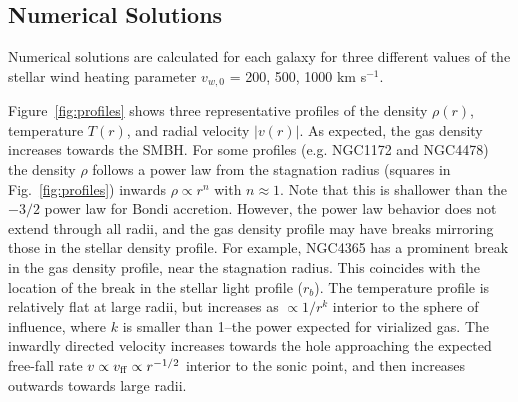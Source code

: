 \documentclass[usenatbib,fleqn]{mn2e}
\newcommand{\rb}{r_b}
\begin{document}

\subsection{Numerical Solutions}

Numerical solutions are calculated for each galaxy for three different values of the stellar wind heating parameter $v_{w,0}$ = 200, 500, 1000 km s$^{-1}$.  

Figure~\ref{fig:profiles} shows three representative profiles of the
density $\rho(r)$, temperature $T(r)$, and radial velocity $|v(r)|$.
As expected, the gas density increases towards the SMBH.  For some
profiles (e.g. NGC1172 and NGC4478) the density $\rho$ follows a power
law from the stagnation radius (squares in Fig.~\ref{fig:profiles})
inwards $\rho \propto r^{n}$ with $n \approx 1$. Note that this is
shallower than the $-3/2$ power law for Bondi accretion. However, the
power law behavior does not extend through all radii, and the gas
density profile may have breaks mirroring those in the stellar density
profile. For example, NGC4365 has a prominent break in the gas density
profile, near the stagnation radius. This coincides with the location
of the break in the stellar light profile ($\rb$). The temperature
profile is relatively flat at large radii, but increases as $\propto
1/r^{k}$ interior to the sphere of influence, where $k$ is smaller
than 1--the power expected for virialized gas.  The inwardly
directed velocity increases towards the hole approaching the expected
free-fall rate $v \propto v_{\rm ff}\propto r^{-1/2}$ interior to the
sonic point, and then increases outwards towards large radii.
\end{document}
